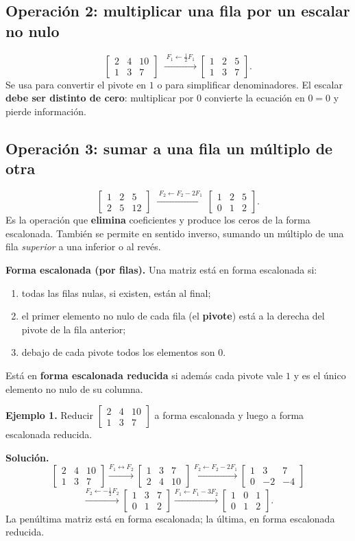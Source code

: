 \documentclass[12pt, letterpaper]{article}
\newcommand{\mwmat}[1]{\ensuremath{\begin{bmatrix}#1\end{bmatrix}}}
\begin{document}
\subsection*{Operación 2: multiplicar una fila por un escalar no nulo}

\[
  \mwmat{2&4&10\\1&3&7}
  \;\xrightarrow{\;F_1\leftarrow \frac12F_1\;}
  \mwmat{1&2&5\\1&3&7}.
\]
Se usa para convertir el pivote en $1$ o para simplificar denominadores. El
escalar \textbf{debe ser distinto de cero}: multiplicar por $0$ convierte la
ecuación en $0=0$ y pierde información.

\subsection*{Operación 3: sumar a una fila un múltiplo de otra}

\[
  \mwmat{1&2&5\\2&5&12}
  \;\xrightarrow{\;F_2\leftarrow F_2-2F_1\;}
  \mwmat{1&2&5\\0&1&2}.
\]
Es la operación que \textbf{elimina} coeficientes y produce los ceros de la
forma escalonada. También se permite en sentido inverso, sumando un múltiplo
de una fila \emph{superior} a una inferior o al revés.

\begin{cuadroteoria}
  \small
  \textbf{Forma escalonada (por filas).} Una matriz está en forma
  escalonada si:
  \begin{enumerate}[leftmargin=1.4em, nosep]
    \item todas las filas nulas, si existen, están al final;
    \item el primer elemento no nulo de cada fila (el \textbf{pivote}) está
          a la derecha del pivote de la fila anterior;
    \item debajo de cada pivote todos los elementos son $0$.
  \end{enumerate}
  Está en \textbf{forma escalonada reducida} si además cada pivote vale $1$
  y es el único elemento no nulo de su columna.
\end{cuadroteoria}

\begin{cuadrosolucion}
  \small
  \textbf{Ejemplo 1.} Reducir
  $\mwmat{2&4&10\\1&3&7}$ a forma escalonada y luego a forma escalonada
  reducida.

  \medskip
  \textbf{Solución.}
  \[
    \mwmat{2&4&10\\1&3&7}
    \xrightarrow{F_1\leftrightarrow F_2}
    \mwmat{1&3&7\\2&4&10}
    \xrightarrow{F_2\leftarrow F_2-2F_1}
    \mwmat{1&3&7\\0&-2&-4}
  \]
  \[
    \xrightarrow{F_2\leftarrow -\frac12F_2}
    \mwmat{1&3&7\\0&1&2}
    \xrightarrow{F_1\leftarrow F_1-3F_2}
    \mwmat{1&0&1\\0&1&2}.
  \]
  La penúltima matriz está en forma escalonada; la última, en forma
  escalonada reducida.
\end{cuadrosolucion}
\end{document}
